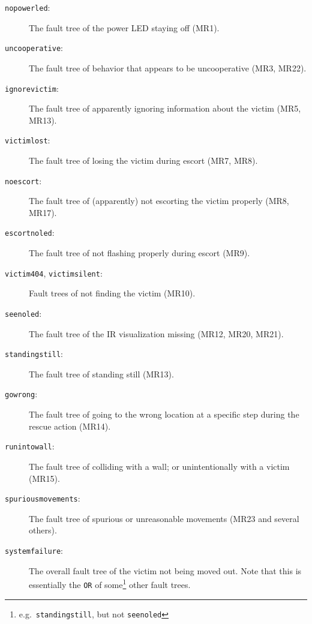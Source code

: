 \documentclass[a4paper,parskip,headheight=38pt]{scrartcl} %
\begin{document}
\begin{description}
\item[\texttt{nopowerled}:]
    The fault tree of the power LED staying off (MR1).
\item[\texttt{uncooperative}:]
    The fault tree of behavior that appears to be uncooperative (MR3, MR22).
\item[\texttt{ignorevictim}:]
    The fault tree of apparently ignoring information about the victim
    (MR5, MR13).
\item[\texttt{victimlost}:]
    The fault tree of losing the victim during escort (MR7, MR8).
\item[\texttt{noescort}:]
    The fault tree of (apparently) not escorting the victim properly
    (MR8, MR17).
\item[\texttt{escortnoled}:]
    The fault tree of not flashing properly during escort (MR9).
\item[\texttt{victim404}, \texttt{victimsilent}:]
    Fault trees of not finding the victim (MR10).
\item[\texttt{seenoled}:]
    The fault tree of the IR visualization missing (MR12, MR20, MR21).
\item[\texttt{standingstill}:]
    The fault tree of standing still (MR13).
\item[\texttt{gowrong}:]
    The fault tree of going to the wrong location at a specific step
    during the rescue action (MR14).
\item[\texttt{runintowall}:]
    The fault tree of colliding with a wall; or unintentionally with a
    victim (MR15).
\item[\texttt{spuriousmovements}:]
    The fault tree of spurious or unreasonable movements (MR23 and
    several others).
\item[\texttt{systemfailure}:]
    The overall fault tree of the victim not being moved out.  Note
    that this is essentially the \texttt{OR} of some\footnote{e.g.\
    \texttt{standingstill}, but not \texttt{seenoled}} other fault
    trees.
\end{description}
\end{document}
